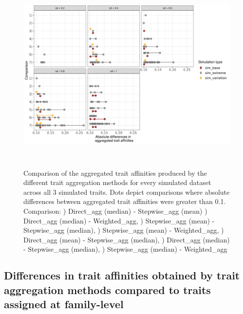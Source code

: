 \documentclass{article}
\begin{document}
\begin{figure}[H]
  \centering
  \includegraphics[width=16.5cm, height=10cm]{Diffs_indiv_runs_sim.png}
  \caption{Comparison of the aggregated trait affinities produced by the different trait aggregation methods for every simulated dataset across all 3 simulated traits. Dots depict comparisons where absolute differences between aggregated trait affinities were greater than 0.1. \newline
  Comparison: ) Direct\_agg (median) - Stepwise\_agg (mean) ) Direct\_agg (median) - Weighted\_agg, ) Stepwise\_agg (mean) - Stepwise\_agg (median), ) Stepwise\_agg (mean) - Weighted\_agg, ) Direct\_agg (mean) - Stepwise\_agg (median), ) Direct\_agg (median) - Stepwise\_agg (median), ) Stepwise\_agg (median) - Weighted\_agg \newline
  }
  \label{fig:sim_indv_runs}
\end{figure}

\newpage

\subsection*{Differences in trait affinities obtained by trait aggregation methods compared to traits assigned at family-level}
\label{sec:diff_trait_agg_chessman}
\end{document}
